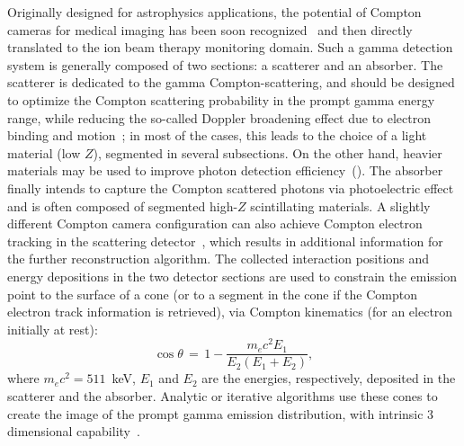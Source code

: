 Originally designed for astrophysics applications, the potential of Compton cameras for medical imaging has been soon recognized~\cite{TODD:1974aa} and then directly translated to the ion beam therapy monitoring domain. Such a gamma detection system is generally  composed of two sections: a scatterer and an absorber. The scatterer is dedicated to the gamma Compton-scattering, and should be designed to optimize the Compton scattering probability in the prompt gamma energy range, while reducing the so-called Doppler broadening effect due to electron binding and motion~\cite{Doppler}; in most of the cases, this leads to the choice of a light material (low $Z$), segmented in several subsections. On the other hand, heavier materials may be used to improve photon detection efficiency~(\cite{Solevi:2016aa, ALDAWOOD2017190, 0031-9155-60-18-7085}). The absorber finally intends to capture the Compton scattered photons via photoelectric effect and is often composed of segmented high-$Z$ scintillating materials. A slightly different Compton camera configuration can also achieve Compton electron tracking in the scattering detector~\cite{Frandes_2010, Yoshihara_ETCC}, which results in additional information for the further reconstruction algorithm.
 The collected interaction positions and energy depositions in the two detector sections are used to constrain the emission point to the surface of a cone (or to a segment in the cone if the Compton electron track information is retrieved), via Compton kinematics (for an electron initially at rest):
\begin{equation}
\cos\theta\,=\,1-\frac{m_{e}c^{2}E_{1}}{E_{2}(E_{1}+E_{2})},
\label{Compton_equation}
\end{equation} 
where \(m_{e}c^{2} = 511\)~keV, \(E_{1}\) and \(E_{2}\) are the energies, respectively, deposited in the scatterer and the absorber. 
Analytic or iterative algorithms use these cones to create the image of the prompt gamma emission distribution, with intrinsic 3 dimensional capability~\cite{Wilderman1998, McKisson3D, Kuchment:2016uiw, Maxim_2018}. 


